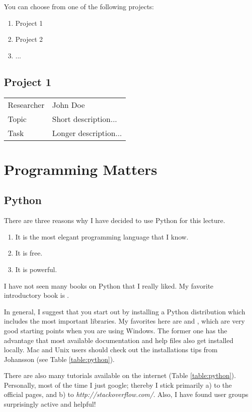You can choose from one of the following projects:

\begin{enumerate}
  \item  Project 1
  \item  Project 2
  \item  ...
\end{enumerate}

\subsection{Project 1}
\begin{tabular}{ l p{12cm} }
    Researcher & John Doe \\
    Topic &  Short description... \\
    Task &   Longer description...
\end{tabular}

\section{Programming Matters}

\subsection{Python}
There are three reasons why I have decided to use Python for this lecture.

\begin{enumerate}
  \item It is the most elegant programming language that I know.
  \item It is free.
  \item It is powerful.
\end{enumerate}

I have not seen many books on Python that I really liked. My favorite introductory book is \cite{Harms2010}.

In general, I suggest that you start out by installing a Python distribution which includes the most important libraries. My favorites here are \cite{pythonxy} and \cite{winpython}, which are very good starting points when you are using Windows. The former one has the advantage that most available documentation and help files also get installed locally. Mac and Unix users should check out the installations tips from Johansson (see Table \ref{table:python}).

There are also many tutorials available on the internet (Table \ref{table:python}). Personally, most of the time I just google; thereby I stick primarily a) to the official pages, and b) to \emph{http://stackoverflow.com/}. Also, I have found user groups surprisingly active and helpful!

